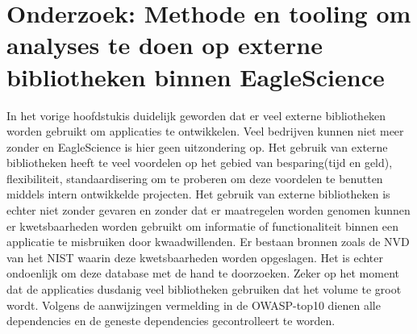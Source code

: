 
\chapter{Onderzoek: Methode en tooling om analyses te doen op externe bibliotheken binnen EagleScience}\label{ch:onderzoek:-methode-en-tooling-om-analyses-te-doen-op-externe-bibliotheken-binnen-eaglescience}
In het vorige hoofdstukis duidelijk geworden dat er veel externe bibliotheken worden gebruikt om applicaties te ontwikkelen. Veel bedrijven kunnen niet meer zonder en EagleScience is hier geen uitzondering op. Het gebruik van externe bibliotheken heeft te veel voordelen op het gebied van besparing(tijd en geld), flexibiliteit, standaardisering om te proberen om deze voordelen te benutten middels intern ontwikkelde projecten. Het gebruik van externe bibliotheken is echter niet zonder gevaren en zonder dat er maatregelen worden genomen kunnen er kwetsbaarheden worden gebruikt om informatie of functionaliteit binnen een applicatie te misbruiken door kwaadwillenden. Er bestaan bronnen zoals de NVD van het NIST waarin deze kwetsbaarheden worden opgeslagen. Het is echter ondoenlijk om deze database met de hand te doorzoeken. Zeker op het moment dat de applicaties dusdanig veel bibliotheken gebruiken dat het volume te groot wordt. Volgens de aanwijzingen vermelding in de OWASP-top10 dienen alle dependencies en de geneste dependencies gecontrolleert te worden.

